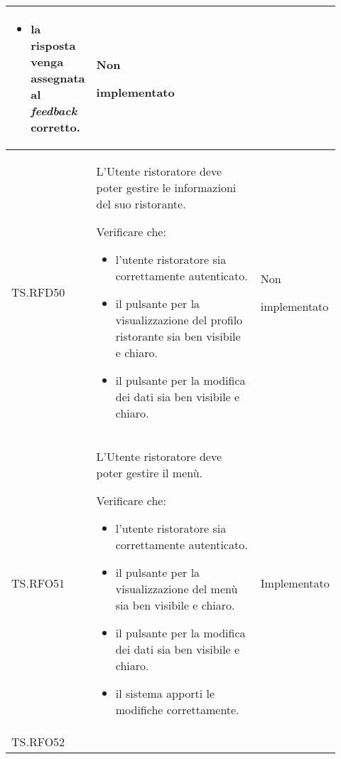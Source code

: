 \begin{longtable}{|p{0.10\linewidth}|p{0.70\linewidth}|p{0.12\linewidth}|}
\begin{itemize}
		\item la risposta venga assegnata al \textit{feedback} corretto.
	\end{itemize}             
	                                                      &
	Non \par implementato                                                                                                                                                   \\
	\hline
	TS.RFD50                                                                                                                        &
	L'Utente ristoratore deve poter gestire le informazioni del suo ristorante. \par
	Verificare che:
	\begin{itemize}
		\item l'utente ristoratore sia correttamente autenticato.
		\item il pulsante per la visualizzazione del profilo ristorante sia ben visibile e chiaro.
		\item il pulsante per la modifica dei dati sia ben visibile e chiaro.
	\end{itemize}                                      &
	Non \par implementato                                                                                                                                                   \\
	\hline
	TS.RFO51                                                                                                                        &
	L'Utente ristoratore deve poter gestire il menù. \par
	Verificare che:
	\begin{itemize}
		\item l'utente ristoratore sia correttamente autenticato.
		\item il pulsante per la visualizzazione del menù sia ben visibile e chiaro.
		\item il pulsante per la modifica dei dati sia ben visibile e chiaro.
		\item il sistema apporti le modifiche correttamente.
	\end{itemize}                                                    &
	Implementato                                                                                                                                                   \\
	\hline
	TS.RFO52                                                                                                                        &

\end{longtable}
